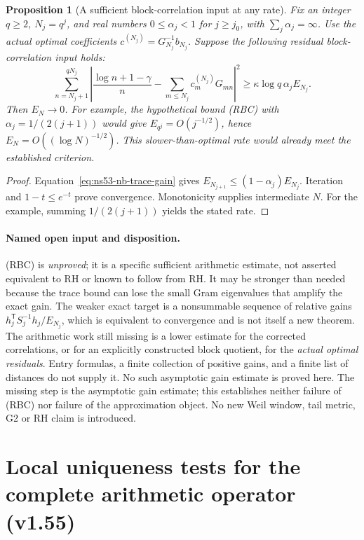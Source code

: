 \documentclass[11pt]{article}
\newtheorem{proposition}[theorem]{Proposition}
\theoremstyle{remark}
\begin{document}
\begin{proposition}[A sufficient block-correlation input at any rate]
\label{prop:ns53-nb-any-rate}
Fix an integer $q\geq2$, $N_j=q^j$, and real numbers
$0\leq\alpha_j<1$ for $j\geq j_0$, with $\sum_j\alpha_j=\infty$.
Use the actual optimal coefficients $c^{(N_j)}=G_{N_j}^{-1}b_{N_j}$.
Suppose the following \emph{residual block-correlation input} holds:
\begin{equation*}
 \sum_{n=N_j+1}^{qN_j}
 \left|\frac{\log n+1-\gamma}{n}
       -\sum_{m\leq N_j}c_m^{(N_j)}G_{mn}\right|^2
 \geq\kappa\log q\,\alpha_j E_{N_j}.
 \tag{RBC}\label{eq:ns53-nb-rbc}
\end{equation*}
Then $E_N\to0$. For example, the hypothetical bound (RBC) with
$\alpha_j=1/(2(j+1))$ would give
$E_{q^j}=O(j^{-1/2})$, hence $E_N=O((\log N)^{-1/2})$.
This slower-than-optimal rate would already meet the established criterion.
\end{proposition}

\begin{proof}
Equation~\eqref{eq:ns53-nb-trace-gain} gives
$E_{N_{j+1}}\leq(1-\alpha_j)E_{N_j}$. Iteration and
$1-t\leq e^{-t}$ prove convergence. Monotonicity supplies intermediate
$N$. For the example, summing $1/(2(j+1))$ yields the stated rate.
\end{proof}

\paragraph{Named open input and disposition.}
(RBC) is \emph{unproved}; it is a specific sufficient arithmetic estimate,
not asserted equivalent to RH or known to follow from RH. It may be
stronger than needed because the trace bound can lose the small
Gram eigenvalues that amplify the exact gain. The weaker exact target is
a nonsummable sequence of relative gains
$h_j^{\mathsf T}S_j^{-1}h_j/E_{N_j}$, which is equivalent to convergence
and is not itself a new theorem. The arithmetic work still missing is
a lower estimate for the corrected correlations, or for an explicitly
constructed block quotient, for the \emph{actual optimal residuals}.
Entry formulas, a finite collection of positive gains, and a finite list of distances
do not supply it. No such asymptotic gain estimate is proved here.
The missing step is the asymptotic gain estimate; this establishes
neither failure of (RBC) nor failure of the approximation object. No new Weil window, tail metric, G2 or RH
claim is introduced.

\section{Local uniqueness tests for the complete arithmetic operator (v1.55)}
\label{sec:v155-local-uniqueness}
\end{document}
